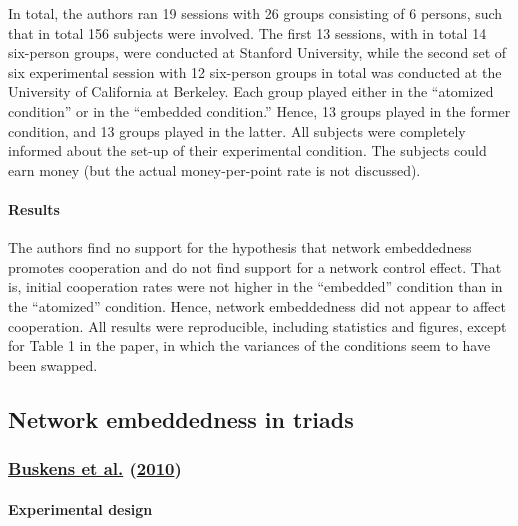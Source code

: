 \documentclass[
  11pt,
]{article}
\begin{document}
In total, the authors ran 19 sessions with 26 groups consisting of 6 persons, such that in total 156 subjects were involved. The first 13 sessions, with in total 14 six-person groups, were conducted at Stanford University, while the second set of six experimental session with 12 six-person groups in total was conducted at the University of California at Berkeley. Each group played either in the ``atomized condition'' or in the ``embedded condition.'' Hence, 13 groups played in the former condition, and 13 groups played in the latter. All subjects were completely informed about the set-up of their experimental condition. The subjects could earn money (but the actual money-per-point rate is not discussed).

\hypertarget{results-4}{%
\paragraph{Results}\label{results-4}}

The authors find no support for the hypothesis that network embeddedness promotes cooperation and do not find support for a network control effect.
That is, initial cooperation rates were not higher in the ``embedded'' condition than in the ``atomized'' condition.
Hence, network embeddedness did not appear to affect cooperation.
All results were reproducible, including statistics and figures, except for Table 1 in the paper, in which the variances of the conditions seem to have been swapped.

\hypertarget{network-embeddedness-in-triads}{%
\subsection{Network embeddedness in triads}\label{network-embeddedness-in-triads}}

\hypertarget{buskens_raub_veer_triads_2010}{%
\subsubsection{\texorpdfstring{\protect\hyperlink{ref-buskens_raub_veer_triads_2010}{Buskens et al.} (\protect\hyperlink{ref-buskens_raub_veer_triads_2010}{2010})}{Buskens et al. (2010)}}\label{buskens_raub_veer_triads_2010}}

\hypertarget{experimental-design-4}{%
\paragraph{Experimental design}\label{experimental-design-4}}
\end{document}
